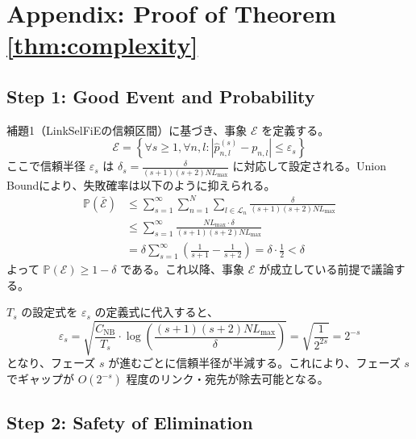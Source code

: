 \documentclass[conference]{IEEEtran}
\begin{document}
\section{Appendix: Proof of Theorem \ref{thm:complexity}}

\subsection{Step 1: Good Event and Probability}
補題1（LinkSelFiEの信頼区間）に基づき、事象 $\mathcal{E}$ を定義する。
\begin{equation}
    \mathcal{E} = \left\{ \forall s \ge 1, \forall n, l : | \hat{p}_{n,l}^{(s)} - p_{n,l} | \le \varepsilon_s \right\}
\end{equation}
ここで信頼半径 $\varepsilon_s$ は $\delta_s = \frac{\delta}{(s+1)(s+2) N L_{\max}}$ に対応して設定される。Union Boundにより、失敗確率は以下のように抑えられる。
\begin{align}
    \mathbb{P}(\bar{\mathcal{E}}) &\le \sum_{s=1}^{\infty} \sum_{n=1}^{N} \sum_{l \in \mathcal{L}_n} \frac{\delta}{(s+1)(s+2) N L_{\max}} \\
    &\le \sum_{s=1}^{\infty} \frac{N L_{\max} \cdot \delta}{(s+1)(s+2) N L_{\max}} \\
    &= \delta \sum_{s=1}^{\infty} \left( \frac{1}{s+1} - \frac{1}{s+2} \right) = \delta \cdot \frac{1}{2} < \delta
\end{align}
よって $\mathbb{P}(\mathcal{E}) \ge 1-\delta$ である。これ以降、事象 $\mathcal{E}$ が成立している前提で議論する。

\begin{remark}
$T_s$ の設定式を $\varepsilon_s$ の定義式に代入すると、
\begin{equation}
    \varepsilon_s = \sqrt{\frac{C_{\mathrm{NB}}}{T_s} \cdot \log\left( \frac{(s+1)(s+2) N L_{\max}}{\delta} \right)} = \sqrt{\frac{1}{2^{2s}}} = 2^{-s}
\end{equation}
となり、フェーズ $s$ が進むごとに信頼半径が半減する。これにより、フェーズ $s$ でギャップが $O(2^{-s})$ 程度のリンク・宛先が除去可能となる。
\end{remark}

\subsection{Step 2: Safety of Elimination}
\end{document}

